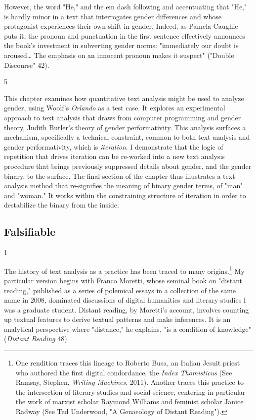 \documentclass[11pt]{article}
\begin{document}
However, the word "He," and the em dash following and accentuating
that "He," is hardly minor in a text that interrogates gender
differences and whose protagonist experiences their own shift in
gender. Indeed, as Pamela Caughie puts it, the pronoun and punctuation
in the first sentence effectively announces the book's investment in
subverting gender norms: "immediately our doubt is aroused\ldots{} The
emphasis on an innocent pronoun makes it suspect" ("Double Discourse"
42).

5

This chapter examines how quantitative text analysis might be used to
analyze gender, using Woolf’s \emph{Orlando} as a test case. It explores an
experimental approach to text analysis that draws from computer
programming and gender theory, Judith Butler's theory of gender
performativity. This analysis surfaces a mechanism, specifically a
technical constraint, common to both text analysis and gender
performativity, which is \emph{iteration}. I demonstrate that the logic of
repetition that drives iteration can be re-worked into a new text
analysis procedure that brings previously suppressed details about
gender, and the gender binary, to the surface. The final section of
the chapter thus illustrates a text analysis method that re-signifies
the meaning of binary gender terms, of "man" and "woman." It works
within the constraining structure of iteration in order to destabilize
the binary from the inside.

\subsection{Falsifiable}
\label{sec:orgc2294fa}
1

The history of text analysis as a practice has been traced to many
origins.\footnote{One rendition traces this lineage to Roberto Busa, an Italian
Jesuit priest who authored the first digital condordance, the \emph{Index
Thomisticus} (See Ramsay, Stephen, \emph{Writing Machines}. 2011). Another
traces this practice to the intersection of literary studies and
social science, centering in particular the work of marxist scholar
Raymond Williams and feminist scholar Janice Radway (See Ted
Underwood, "A Genaeology of Distant Reading").} My particular version begins with Franco Moretti, whose
seminal book on "distant reading," published as a series of polemical
essays in a collection of the same name in 2008, dominated discussions
of digital humanities and literary studies I was a graduate student.
Distant reading, by Moretti's account, involves counting up textual
features to derive textual patterns and make inferences. It is an
analytical perspective where "distance," he explains, "is a condition
of knowledge" (\emph{Distant Reading} 48).
\end{document}
